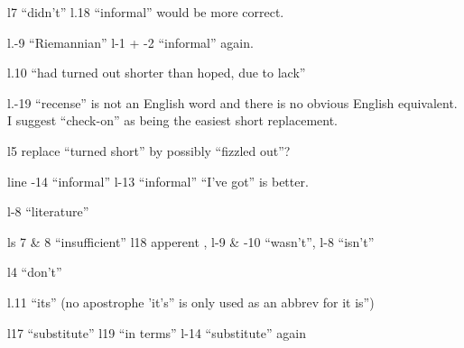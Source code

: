 
\begingroup
\setlength{\parindent}{0pt}

\hangindent=1.2cm l7 ``didn't'' l.18 ``informal'' would be more correct.

\hangindent=1.2cm \hspace*{1.2cm}l.-9  ``Riemannian'' l-1 + -2 ``informal'' again.

\hangindent=1.2cm l.10 ``had turned out shorter than hoped, due to lack''

\hangindent=1.2cm \hspace*{1.2cm}l.-19 ``recense'' is not an English word and there is no obvious English equivalent. I suggest ``check-on'' as being the easiest short replacement.

\hangindent=1.2cm l5  replace ``turned short'' by possibly ``fizzled out''?

\reversemarginpar{}\normalmarginpar \hangindent=1.2cm line -14 ``informal'' l-13 ``informal''
``I've got'' is better.

\hangindent=1.2cm \hspace*{1.2cm}l-8 ``literature''

\hangindent=1.2cm ls 7 \& 8 ``insufficient'' l18 apperent , l-9 \& -10 ``wasn't'', l-8 ``isn't''

\hangindent=1.2cm l4 ``don't''

\hangindent=1.2cm l.11 ``its'' (no apostrophe 'it's'' is only used as an abbrev for it is'')

\hangindent=1.2cm \hspace*{1.2cm}l17 ``substitute'' l19 ``in terms'' l-14 ``substitute'' again

